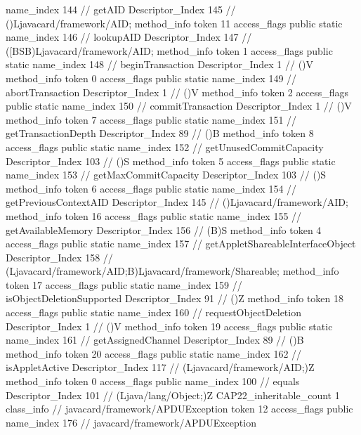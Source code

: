 {{{{{					name_index	144		// getAID
					Descriptor_Index	145		// ()Ljavacard/framework/AID;
				}
				method_info {
					token	11
					access_flags	public static
					name_index	146		// lookupAID
					Descriptor_Index	147		// ([BSB)Ljavacard/framework/AID;
				}
				method_info {
					token	1
					access_flags	public static
					name_index	148		// beginTransaction
					Descriptor_Index	1		// ()V
				}
				method_info {
					token	0
					access_flags	public static
					name_index	149		// abortTransaction
					Descriptor_Index	1		// ()V
				}
				method_info {
					token	2
					access_flags	public static
					name_index	150		// commitTransaction
					Descriptor_Index	1		// ()V
				}
				method_info {
					token	7
					access_flags	public static
					name_index	151		// getTransactionDepth
					Descriptor_Index	89		// ()B
				}
				method_info {
					token	8
					access_flags	public static
					name_index	152		// getUnusedCommitCapacity
					Descriptor_Index	103		// ()S
				}
				method_info {
					token	5
					access_flags	public static
					name_index	153		// getMaxCommitCapacity
					Descriptor_Index	103		// ()S
				}
				method_info {
					token	6
					access_flags	public static
					name_index	154		// getPreviousContextAID
					Descriptor_Index	145		// ()Ljavacard/framework/AID;
				}
				method_info {
					token	16
					access_flags	public static
					name_index	155		// getAvailableMemory
					Descriptor_Index	156		// (B)S
				}
				method_info {
					token	4
					access_flags	public static
					name_index	157		// getAppletShareableInterfaceObject
					Descriptor_Index	158		// (Ljavacard/framework/AID;B)Ljavacard/framework/Shareable;
				}
				method_info {
					token	17
					access_flags	public static
					name_index	159		// isObjectDeletionSupported
					Descriptor_Index	91		// ()Z
				}
				method_info {
					token	18
					access_flags	public static
					name_index	160		// requestObjectDeletion
					Descriptor_Index	1		// ()V
				}
				method_info {
					token	19
					access_flags	public static
					name_index	161		// getAssignedChannel
					Descriptor_Index	89		// ()B
				}
				method_info {
					token	20
					access_flags	public static
					name_index	162		// isAppletActive
					Descriptor_Index	117		// (Ljavacard/framework/AID;)Z
				}
				method_info {
					token	0
					access_flags	public
					name_index	100		// equals
					Descriptor_Index	101		// (Ljava/lang/Object;)Z
				}
			}
			CAP22_inheritable_count	1
		}
		class_info {		// javacard/framework/APDUException
			token	12
			access_flags	public
			name_index	176		// javacard/framework/APDUException
}}}

